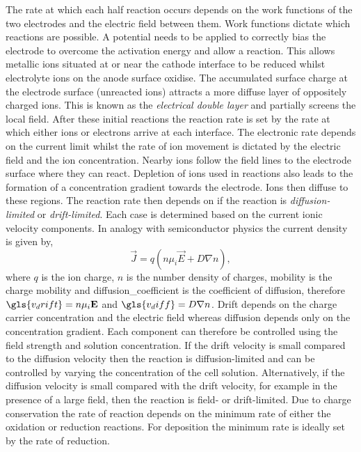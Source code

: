 \documentclass{article}
\begin{document}
The rate at which each half reaction occurs depends on the work functions of the two electrodes and the electric field between them. Work functions dictate which reactions are possible. A potential needs to be applied to correctly bias the electrode to overcome the activation energy and allow a reaction. This allows metallic ions situated at or near the cathode interface to be reduced whilst electrolyte ions on the anode surface oxidise. The accumulated surface charge at the electrode surface (unreacted ions) attracts a more diffuse layer of oppositely charged ions. This is known as the \textit{electrical double layer} and partially screens the local field. After these initial reactions the reaction rate is set by the rate at which either ions or electrons arrive at each interface. The electronic rate depends on the current limit whilst the rate of ion movement is dictated by the electric field and the ion concentration. Nearby ions follow the field lines to the electrode surface where they can react. Depletion of ions used in reactions also leads to the formation of a concentration gradient towards the electrode. Ions then diffuse to these regions. The reaction rate then depends on if the reaction is \textit{diffusion-limited} or \textit{drift-limited}. Each case is determined based on the current ionic velocity components. In analogy with semiconductor physics the current density is given by,
\begin{equation} \vec{J} = q\left(n\mu_i\vec{E} + D\nabla n\right), \end{equation}
where $q$ is the ion charge, $n$ is the number density of charges, \gls{mobility} is the charge mobility and \gls{diffusion_coefficient} is the coefficient of diffusion, therefore $\gls{v_drift} = n\mu_i\vec{E}$ and $\gls{v_diff} = D\nabla n$. Drift depends on the charge carrier concentration and the electric field whereas diffusion depends only on the concentration gradient. Each component can therefore be controlled using the field strength and solution concentration.
If the drift velocity is small compared to the diffusion velocity then the reaction is diffusion-limited and can be controlled by varying the concentration of the cell solution.
Alternatively, if the diffusion velocity is small compared with the drift velocity, for example in the presence of a large field, then the reaction is field- or drift-limited.
Due to charge conservation the rate of reaction depends on the minimum rate of either the oxidation or reduction reactions. For deposition the minimum rate is ideally set by the rate of reduction.
\end{document}
